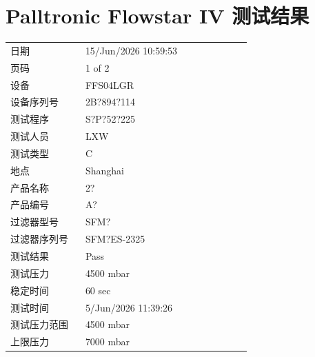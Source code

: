 \documentclass[UTF8,10pt,a4paper,fontset=fandol]{ctexart}
\newcommand{\fieldvalue}[1]{#1}
\begin{document}
\newpage

\section{Palltronic Flowstar IV 测试结果}

\begin{tabular}{@{}p{0.28\linewidth}p{0.62\linewidth}@{}}
日期 & %
\fieldvalue{15/Jun/2026 10:59:53} \\
页码 & %
\fieldvalue{1 of 2} \\
设备 & %
\fieldvalue{FFS04LGR} \\
设备序列号 & %
\fieldvalue{2B?894?114} \\
测试程序 & %
\fieldvalue{S?P?52?225} \\
测试人员 & %
\fieldvalue{LXW} \\
测试类型 & %
\fieldvalue{C} \\
地点 & %
\fieldvalue{Shanghai} \\
产品名称 & %
\fieldvalue{2?} \\
产品编号 & %
\fieldvalue{A?} \\
过滤器型号 & %
\fieldvalue{SFM?} \\
过滤器序列号 & %
\fieldvalue{SFM?ES-2325} \\
测试结果 & %
\fieldvalue{Pass} \\
测试压力 & %
\fieldvalue{4500 mbar} \\
稳定时间 & %
\fieldvalue{60 sec} \\
测试时间 & %
\fieldvalue{5/Jun/2026 11:39:26} \\
测试压力范围 & %
\fieldvalue{4500 mbar} \\
上限压力 & %
\fieldvalue{7000 mbar} \\
\end{tabular}
\end{document}
